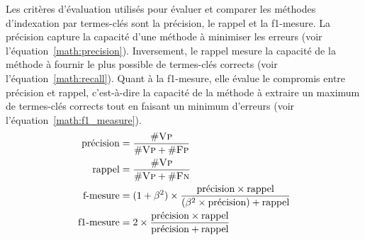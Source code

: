     Les critères d'évaluation utilisés pour évaluer et comparer les méthodes
    d'indexation par termes-clés sont la précision, le rappel et la f1-mesure.
    La précision capture la capacité d'une méthode à minimiser les erreurs (voir
    l'équation~\ref{math:precision}). Inversement, le rappel mesure la capacité de
    la méthode à fournir le plus possible de termes-clés corrects (voir l'équation~\ref{math:recall}). Quant à la f1-mesure, elle évalue le compromis
    entre précision et rappel, c'est-à-dire la capacité de la méthode à extraire
    un maximum de termes-clés corrects tout en faisant un minimum d'erreurs
    (voir l'équation~\ref{math:f1_measure}).
    \begin{align}
      \text{précision} &= \frac{\#\textsc{Vp}}{\#\textsc{Vp} + \#\textsc{Fp}} \label{math:precision}\\
      \text{rappel} &= \frac{\#\textsc{Vp}}{\#\textsc{Vp} + \#\textsc{Fn}} \label{math:recall}\\
      \text{f-mesure} &= (1 + \beta^2) \times \frac{\text{précision} \times \text{rappel}}{(\beta^2 \times \text{précision}) + \text{rappel}} \label{math:f_measure}\\
      \text{f1-mesure} &= 2 \times \frac{\text{précision} \times \text{rappel}}{\text{précision} + \text{rappel}} \label{math:f1_measure}
    \end{align}
      

